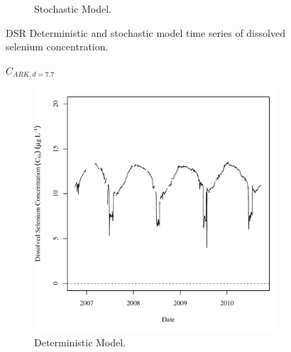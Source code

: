 \begin{linenumbers}
\begin{landscape}
\begin{figure}
\begin{subfigure}{0.7\textwidth}
			\caption{Stochastic Model.}
		\end{subfigure}
		\caption{DSR Deterministic and stochastic model time series of dissolved selenium concentration.}
	\end{figure}
\end{landscape}

\subfiguremid
\begin{landscape}
	\begin{figure}
		$ C_{ARK,d=7.7} $
		\begin{subfigure}{0.7\textwidth}
			\centering
			\includegraphics[width=\tableCustomSize]{"Figures/Results_DSR/Deterministic/c TS BUF"}
			\caption{Deterministic Model.}
		\end{subfigure}%
		\begin{subfigure}{0.7\textwidth}
			\centering

\end{subfigure}
\end{figure}
\end{landscape}
\end{linenumbers}
